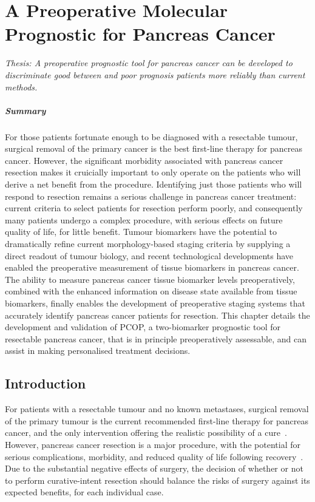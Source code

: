 \documentclass[dissertation.tex]{subfiles}
\begin{document}
\chapter[A Preoperative Molecular Prognostic for Pancreas Cancer][Preoperative Prognosis]{A Preoperative Molecular Prognostic for Pancreas Cancer}
\label{chap:nomogram}

\emph{Thesis: A preoperative prognostic tool for pancreas cancer can be developed to discriminate good between and poor prognosis patients more reliably than current methods.}

\paragraph{Summary}
For those patients fortunate enough to be diagnosed with a resectable tumour, surgical removal of the primary cancer is the best first-line therapy for pancreas cancer.  However, the significant morbidity associated with pancreas cancer resection makes it cruicially important to only operate on the patients who will derive a net benefit from the procedure.  Identifying just those patients who will respond to resection remains a serious challenge in pancreas cancer treatment: current criteria to select patients for resection perform poorly, and consequently many patients undergo a complex procedure, with serious effects on future quality of life, for little benefit.  Tumour biomarkers have the potential to dramatically refine current morphology-based staging criteria by supplying a direct readout of tumour biology, and recent technological developments have enabled the preoperative measurement of tissue biomarkers in pancreas cancer.  The ability to measure pancreas cancer tissue biomarker levels preoperatively, combined with the enhanced information on disease state available from tissue biomarkers, finally enables the development of preoperative staging systems that accurately identify pancreas cancer patients for resection.  This chapter details the development and validation of \gls{PCOP}, a two-biomarker prognostic tool for resectable pancreas cancer, that is in principle preoperatively assessable, and can assist in making personalised treatment decisions.


\section{Introduction}
For patients with a resectable tumour and no known metastases, surgical removal of the primary tumour is the current recommended first-line therapy for pancreas cancer, and the only intervention offering the realistic possibility of a cure~\cite{Editors2015}.  However, pancreas cancer resection is a major procedure, with the potential for serious complications, morbidity, and reduced quality of life following recovery~\cite{Ho2005}.  Due to the substantial negative effects of surgery, the decision of whether or not to perform curative-intent resection should balance the risks of surgery against its expected benefits, for each individual case.
\end{document}
